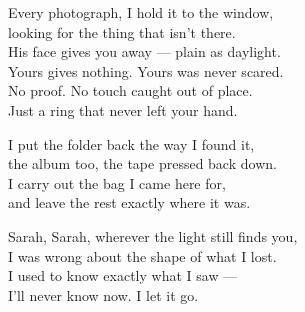 \begin{lyrics}
Every photograph, I hold it to the window,\\
looking for the thing that isn't there.\\
His face gives you away — plain as daylight.\\
Yours gives nothing. Yours was never scared.\\
No proof. No touch caught out of place.\\
Just a ring that never left your hand.

I put the folder back the way I found it,\\
the album too, the tape pressed back down.\\
I carry out the bag I came here for,\\
and leave the rest exactly where it was.

Sarah, Sarah, wherever the light still finds you,\\
I was wrong about the shape of what I lost.\\
I used to know exactly what I saw —\\
I'll never know now. I let it go.
\end{lyrics}

